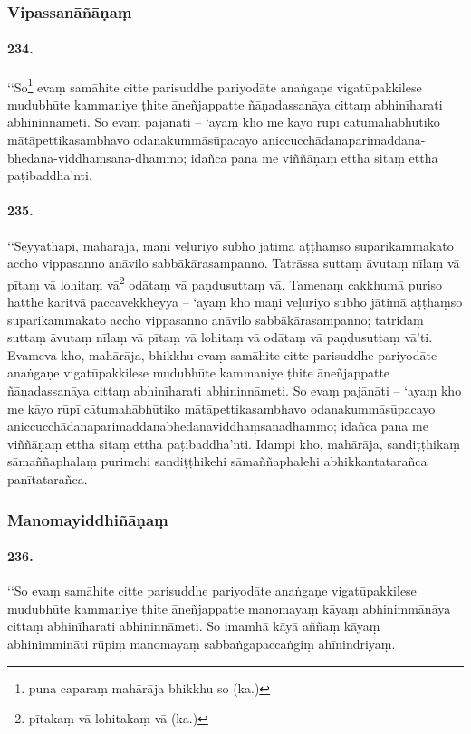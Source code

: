 \subsubsection{Vipassanāñāṇaṃ}

\paragraph{234.} ‘‘So\footnote{puna caparaṃ mahārāja bhikkhu so (ka.)} evaṃ samāhite citte parisuddhe pariyodāte anaṅgaṇe vigatūpakkilese mudubhūte kammaniye ṭhite āneñjappatte ñāṇadassanāya cittaṃ abhinīharati abhininnāmeti. So evaṃ pajānāti – ‘ayaṃ kho me kāyo rūpī cātumahābhūtiko mātāpettikasambhavo odanakummāsūpacayo aniccucchādanaparimaddana\hyp{}bhedana\hyp{}viddhaṃsana\hyp{}dhammo; idañca pana me viññāṇaṃ ettha sitaṃ ettha paṭibaddha’nti.

\paragraph{235.} ‘‘Seyyathāpi, mahārāja, maṇi veḷuriyo subho jātimā aṭṭhaṃso suparikammakato accho vippasanno anāvilo sabbākārasampanno. Tatrāssa suttaṃ āvutaṃ nīlaṃ vā pītaṃ vā lohitaṃ vā\footnote{pītakaṃ vā lohitakaṃ vā (ka.)} odātaṃ vā paṇḍusuttaṃ vā. Tamenaṃ cakkhumā puriso hatthe karitvā paccavekkheyya – ‘ayaṃ kho maṇi veḷuriyo subho jātimā aṭṭhaṃso suparikammakato accho vippasanno anāvilo sabbākārasampanno; tatridaṃ suttaṃ āvutaṃ nīlaṃ vā pītaṃ vā lohitaṃ vā odātaṃ vā paṇḍusuttaṃ vā’ti. Evameva kho, mahārāja, bhikkhu evaṃ samāhite citte parisuddhe pariyodāte anaṅgaṇe vigatūpakkilese mudubhūte kammaniye ṭhite āneñjappatte ñāṇadassanāya cittaṃ abhinīharati abhininnāmeti. So evaṃ pajānāti – ‘ayaṃ kho me kāyo rūpī cātumahābhūtiko mātāpettikasambhavo odanakummāsūpacayo aniccucchādanaparimaddanabhedanaviddhaṃsanadhammo; idañca pana me viññāṇaṃ ettha sitaṃ ettha paṭibaddha’nti. Idampi kho, mahārāja, sandiṭṭhikaṃ sāmaññaphalaṃ purimehi sandiṭṭhikehi sāmaññaphalehi abhikkantatarañca paṇītatarañca.

\subsubsection{Manomayiddhiñāṇaṃ}

\paragraph{236.} ‘‘So evaṃ samāhite citte parisuddhe pariyodāte anaṅgaṇe vigatūpakkilese mudubhūte kammaniye ṭhite āneñjappatte manomayaṃ kāyaṃ abhinimmānāya cittaṃ abhinīharati abhininnāmeti. So imamhā kāyā aññaṃ kāyaṃ abhinimmināti rūpiṃ manomayaṃ sabbaṅgapaccaṅgiṃ ahīnindriyaṃ.


